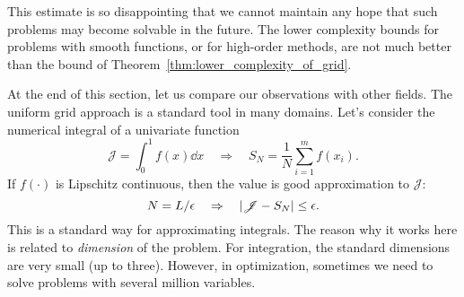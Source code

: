 This estimate is so disappointing that we cannot maintain any hope that such problems may become solvable in the future. The lower complexity bounds for problems 
with smooth functions, or for high-order methods, are not much better than the bound of Theorem~\ref{thm:lower_complexity_of_grid}.


At the end of this section, let us compare our observations with other fields. The uniform grid approach is a standard tool in many domains. Let's consider the numerical integral of a univariate function
\[
    \mathscr{J} = \int_{0}^1 f(x) \dd x \quad \Rightarrow \quad S_N = \frac{1}{N} \sum_{i=1}^m f(x_i).
\]
If \(f(\cdot)\) is Lipschitz continuous, then the value is good approximation to \(\mathscr{J}\):
\[
    N = L / \epsilon  \quad \Rightarrow \quad \abs{\mathscr{J} - S_N} \le \epsilon.
\]
This is a standard way for approximating integrals. The reason why it works here is related to \emph{dimension} of the problem. For integration, the standard dimensions are very small (up to three). However, in optimization, sometimes we need to
solve problems with several million variables.

